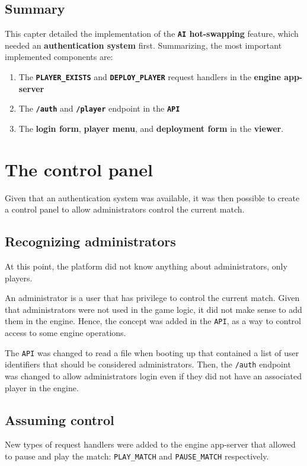 \documentclass[a4paper,11pt,titlepage,abstract,numbers=noenddot,automark,mnsy,intlimits,rgb,dvipsnames]{report}
\begin{document}
\section{Summary}
This capter detailed the implementation of the \textbf{\texttt{AI} hot-swapping} feature, which needed an
\textbf{authentication system} first. Summarizing, the most important implemented components are:
\begin{enumerate}
\item
The \textbf{\texttt{PLAYER\_EXISTS}} and \textbf{\texttt{DEPLOY\_PLAYER}} request handlers in the \textbf{engine app-server}
\item
The \textbf{\texttt{/auth}} and \textbf{\texttt{/player}} endpoint in the \textbf{\texttt{API}}
\item
The \textbf{login form}, \textbf{player menu}, and \textbf{deployment form} in the \textbf{viewer}.
\end{enumerate}
\chapter{The control panel}
\label{control_panel}
Given that an authentication system was available, it was then possible to create a control panel
to allow administrators control the current match.
\section{Recognizing administrators}
At this point, the platform did not know anything about administrators, only players.

An administrator is a user that has privilege to control the current match. Given that administrators were not used
in the game logic, it did not make sense to add them in the engine. Hence, the concept was added in the \texttt{API}, as a way
to control access to some engine operations.

The \texttt{API} was changed to read a file when booting up that contained a list of user identifiers that should be considered
administrators. Then, the \texttt{/auth} endpoint was changed to allow administrators login even if they did not have an associated
player in the engine.
\section{Assuming control}
New types of request handlers were added to the engine app-server that allowed to pause and play the match: \texttt{PLAY\_MATCH} and
\texttt{PAUSE\_MATCH} respectively.
\end{document}

